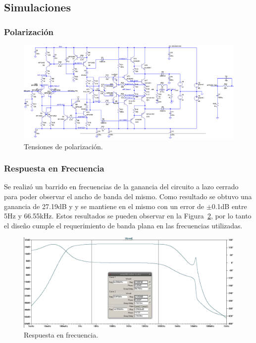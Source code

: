 \subsection{Simulaciones}
\bigskip
\subsubsection{Polarización}

\begin{figure}[H]
\centering
\centerline{
\includegraphics[width=\textwidth]{img/polarizacion.png}}
\caption{Tensiones de polarización.}
\label{polarizacion_sim} 
\end{figure}
\medskip
\subsubsection{Respuesta en Frecuencia}

Se realizó un barrido en frecuencias de la ganancia del circuito a lazo cerrado para poder observar el ancho de banda del mismo. Como resultado se obtuvo una ganancia de 27.19dB y y se mantiene en el mismo con un error de $\pm$0.1dB entre 5Hz y 66.55kHz.
Estos resultados se pueden observar en la Figura~\ref{resp_frec}, por lo tanto el diseño cumple el requerimiento de banda plana en las frecuencias utilizadas. 

\begin{figure}[H]
\centering
\centerline{
\includegraphics[width=\textwidth]{img/ancho_de_banda.png}}
\caption{Respuesta en frecuencia.}
\label{resp_frec} 
\end{figure}

